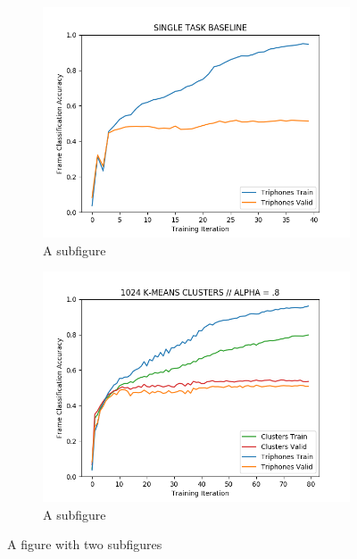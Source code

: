 \documentclass[final]{beamer} %
\begin{document}
\begin{frame}
\begin{columns}
\begin{column}{0.3\textwidth}
{        \begin{figure}
          \centering
          \begin{subfigure}{.5\textwidth}
            \centering
            \includegraphics[width=.95\linewidth]{figs/baseline.png}
            \caption{A subfigure}
            \label{fig:sub1}
          \end{subfigure}%
          \begin{subfigure}{.5\textwidth}
            \centering
            \includegraphics[width=.95\linewidth]{figs/1024-clusters.png}
            \caption{A subfigure}
            \label{fig:sub2}
          \end{subfigure}
          \caption{A figure with two subfigures}
          \label{fig:test}
        \end{figure}
        
}
\end{column}
\end{columns}
\end{frame}
\end{document}
